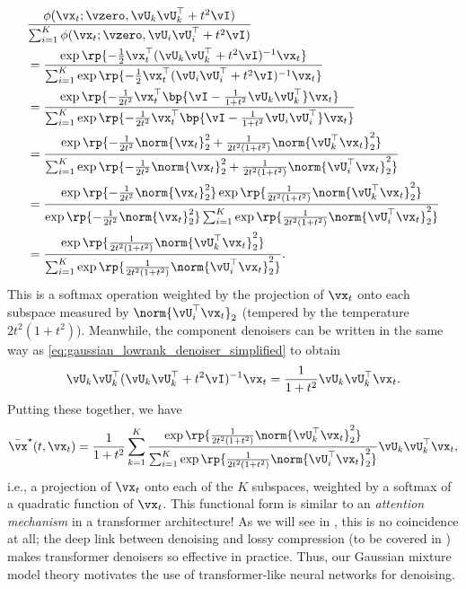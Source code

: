 \documentclass[../../book-main.tex]{subfiles}
\begin{document}
\begin{align}
    &\frac{\phi(\vx_{t} ; \vzero, \vU_{k}\vU_{k}^{\top} + t^{2}\vI)}{\sum_{i
    = 1}^{K}\phi(\vx_{t} ; \vzero, \vU_{i}\vU_{i}^{\top} + t^{2}\vI)} \\
    &= \frac{\exp\rp{-\frac{1}{2}\vx_{t}^{\top}(\vU_{k}\vU_{k}^{\top}
    + t^{2}\vI)^{-1}\vx_{t}}}{\sum_{i =
        1}^{K}\exp\rp{-\frac{1}{2}\vx_{t}^{\top}(\vU_{i}\vU_{i}^{\top} +
    t^{2}\vI)^{-1}\vx_{t}}} \\
    &= \frac{\exp\rp{-\frac{1}{2t^{2}}\vx_{t}^{\top}\bp{\vI -
    \frac{1}{1 + t^{2}}\vU_{k}\vU_{k}^{\top}}\vx_{t}}}{\sum_{i =
        1}^{K}\exp\rp{-\frac{1}{2t^{2}}\vx_{t}^{\top}\bp{\vI - \frac{1}{1
    + t^{2}}\vU_{i}\vU_{i}^{\top}}\vx_{t}}} \\
    &= \frac{\exp\rp{-\frac{1}{2t^{2}}\norm{\vx_{t}}_{2}^{2} +
            \frac{1}{2t^{2}(1 +
    t^{2})}\norm{\vU_{k}^{\top}\vx_{t}}_{2}^{2}}}{\sum_{i =
        1}^{K}\exp\rp{-\frac{1}{2t^{2}}\norm{\vx_{t}}_{2}^{2} +
    \frac{1}{2t^{2}(1 + t^{2})}\norm{\vU_{i}^{\top}\vx_{t}}_{2}^{2}}} \\
    &=
    \frac{\exp\rp{-\frac{1}{2t^{2}}\norm{\vx_{t}}_{2}^{2}}\exp\rp{\frac{1}{2t^{2}(1
                    +
    t^{2})}\norm{\vU_{k}^{\top}\vx_{t}}_{2}^{2}}}{\exp\rp{-\frac{1}{2t^{2}}\norm{\vx_{t}}_{2}^{2}}\sum_{i
        = 1}^{K}\exp\rp{\frac{1}{2t^{2}(1 +
    t^{2})}\norm{\vU_{i}^{\top}\vx_{t}}_{2}^{2}}} \\
    &= \frac{\exp\rp{\frac{1}{2t^{2}(1 +
    t^{2})}\norm{\vU_{k}^{\top}\vx_{t}}_{2}^{2}}}{\sum_{i =
        1}^{K}\exp\rp{\frac{1}{2t^{2}(1 +
    t^{2})}\norm{\vU_{i}^{\top}\vx_{t}}_{2}^{2}}}.
\end{align}
This is a softmax operation weighted by the projection of \(\vx_{t}\)
onto each subspace measured by \(\norm{\vU_{i}^{\top}\vx_{t}}_{2}\)
(tempered by the temperature \(2t^{2}(1 + t^{2})\)). Meanwhile, the
component denoisers can be written in the same way as
\eqref{eq:gaussian_lowrank_denoiser_simplified} to obtain
\begin{equation}
    \vU_{k}\vU_{k}^{\top}(\vU_{k}\vU_{k}^{\top} +
    t^{2}\vI)^{-1}\vx_{t} = \frac{1}{1 + t^{2}}\vU_{k}\vU_{k}^{\top}\vx_{t}.
\end{equation}
Putting these together, we have
\begin{equation}\label{eq:gmm_lowrank_denoiser}
    \bar{\vx}^{\star}(t, \vx_{t}) = \frac{1}{1 + t^{2}}\sum_{k =
    1}^{K}\frac{\exp\rp{\frac{1}{2t^{2}(1 +
    t^{2})}\norm{\vU_{k}^{\top}\vx_{t}}_{2}^{2}}}{\sum_{i =
        1}^{K}\exp\rp{\frac{1}{2t^{2}(1 +
    t^{2})}\norm{\vU_{i}^{\top}\vx_{t}}_{2}^{2}}}\vU_{k}\vU_{k}^{\top}\vx_{t},
\end{equation}
i.e., a projection of \(\vx_{t}\) onto each of the \(K\) subspaces,
weighted by a softmax of a quadratic function of \(\vx_{t}\). This
functional form is similar to an \textit{attention
mechanism} in a transformer architecture! As we will see in
, this is no coincidence at all; the deep
link between denoising and lossy compression (to be covered in
) makes transformer denoisers so
effective in practice. Thus, our Gaussian mixture model
theory motivates the use of transformer-like neural networks for denoising.
\end{document}
